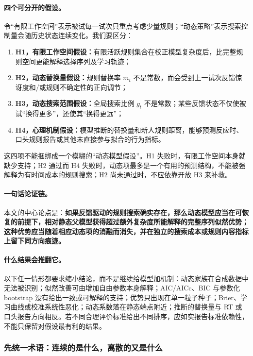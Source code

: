 \paragraph{四个可分开的假设。}
令“有限工作空间”表示被试每一试次只重点考虑少量规则；“动态策略”表示搜索控制量会随历史状态连续变化。我们要区分：
\begin{enumerate}
    \item \textbf{H1，有限工作空间假设：}有限活跃规则集合在校正模型复杂度后，比完整规则空间更能解释选择序列及学习轨迹；
    \item \textbf{H2，动态替换量假设：}规则替换率 $m_t$ 不是常数，而会受到上一试次反馈惊讶度和/或规则不确定性的正向调节；
    \item \textbf{H3，动态搜索范围假设：}全局搜索比例 $g_t$ 不是常数；某些反馈状态不仅使被试“换得更多”，还使其“换得更远”；
    \item \textbf{H4，心理机制假设：}模型推断的替换量和新人规则距离，能够预测反应时、口头规则报告或其他未直接参与拟合的行为指标。
\end{enumerate}

这四项不能捆绑成一个模糊的“动态模型假设”。H1 失败时，有限工作空间本身就缺少支持；H2 通过而 H4 失败时，动态项最多是一个有用的预测结构，不能被强解释为有时间成本的规则搜索；H2 尚未通过时，不应依靠开放 H3 来补救。

\paragraph{一句话论证链。}
本文的中心论点是：\textbf{如果反馈驱动的规则搜索确实存在，那么动态模型应当在可恢复的前提下，相对静态父模型获得超过额外复杂度所能解释的完整序列似然优势；这种优势应当随着相应动态项的消融而消失，并在独立的搜索成本或规则内容指标上留下同方向痕迹。}

\paragraph{什么结果会推翻它。}
以下任一情形都要求缩小结论，而不是继续给模型加机制：动态家族在合成数据中无法被识别；似然改善可由增加自由参数本身解释；AIC/AICc、BIC 与参数化 bootstrap 没有给出一致或可解释的支持；优势只出现在单一粒子种子；Brier、学习曲线或校准系统性恶化；动态系数落在静态端点附近；推断的替换量与 RT 或口头报告方向相反。若不同合理评价标准给出不同排序，应如实报告标准依赖性，不能只保留对假设最有利的结果。


\subsubsection{先统一术语：连续的是什么，离散的又是什么}

